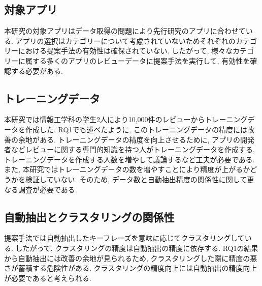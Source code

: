 \subsection{対象アプリ}
本研究の対象アプリはデータ取得の問題により先行研究のアプリに合わせている. アプリの選択はカテゴリーについて考慮されていないためそれぞれのカテゴリーにおける提案手法の有効性は確保されていない. 
したがって, 様々なカテゴリーに属する多くのアプリのレビューデータに提案手法を実行して, 有効性を確認する必要がある. 

\subsection{トレーニングデータ}
本研究では情報工学科の学生2人により10,000件のレビューからトレーニングデータを作成した. RQ1でも述べたように, このトレーニングデータの精度には改善の余地がある. 
トレーニングデータの精度を向上させるために, アプリの開発者などレビューに関する専門的知識を持つ人がトレーニングデータを作成する, トレーニングデータを作成する人数を増やして議論するなど工夫が必要である. 
また, 本研究ではトレーニングデータの数を増やすことにより精度が上がるかどうかを検証していない. そのため, データ数と自動抽出精度の関係性に関して更なる調査が必要である. 

\subsection{自動抽出とクラスタリングの関係性}
提案手法では自動抽出したキーフレーズを意味に応じてクラスタリングしている. したがって, クラスタリングの精度は自動抽出の精度に依存する. 
RQ1の結果から自動抽出には改善の余地が見られるため, クラスタリングした際に精度の悪さが蓄積する危険性がある. クラスタリングの精度向上には自動抽出の精度向上が必要であると考えられる. 